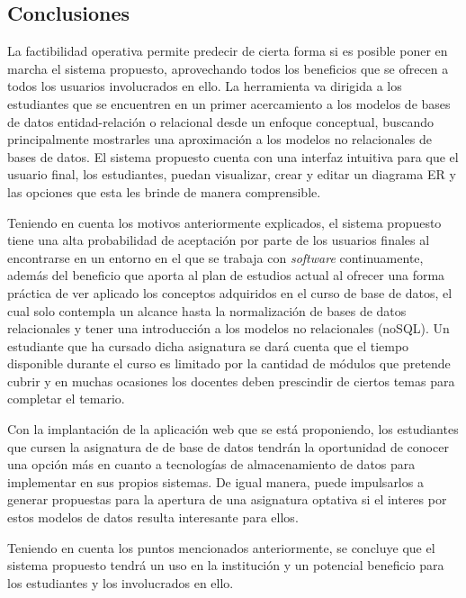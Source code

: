 
\subsection{Conclusiones}


La factibilidad operativa permite predecir de cierta forma si es posible poner en marcha el sistema propuesto, aprovechando todos los beneficios que se ofrecen a todos los usuarios involucrados en ello. La herramienta va dirigida a los estudiantes que se encuentren en un primer acercamiento a los modelos de bases de datos entidad-relación o relacional desde un enfoque conceptual, buscando principalmente mostrarles una aproximación a los modelos no relacionales de bases de datos. El sistema propuesto cuenta con una interfaz intuitiva para que el usuario final, los estudiantes, puedan visualizar, crear y editar un diagrama ER y las opciones que esta les brinde de manera comprensible.


Teniendo en cuenta los motivos anteriormente explicados, el sistema propuesto tiene una alta probabilidad de aceptación por parte de los usuarios finales al encontrarse en un entorno en el que se trabaja con \textit{software} continuamente, además del beneficio que aporta al plan de estudios actual al ofrecer una forma práctica de ver aplicado los conceptos adquiridos en el curso de base de datos, el cual solo contempla un alcance hasta la normalización de bases de datos relacionales y tener una introducción a los modelos no relacionales (noSQL). Un estudiante que ha cursado dicha asignatura se dará cuenta que el tiempo disponible durante el curso es limitado por la cantidad de módulos que pretende cubrir y en muchas ocasiones los docentes deben prescindir de ciertos temas para completar el temario.

Con la implantación de la aplicación web que se está proponiendo, los estudiantes que cursen la asignatura de de base de datos tendrán la oportunidad de conocer una opción más en cuanto a tecnologías de almacenamiento de datos para implementar en sus propios sistemas. De igual manera, puede impulsarlos a generar propuestas para la apertura de una asignatura optativa si el interes por estos modelos de datos resulta interesante para ellos.

Teniendo en cuenta los puntos mencionados anteriormente, se concluye que el sistema propuesto tendrá un uso en la institución y un potencial beneficio para los estudiantes y los involucrados en ello.

